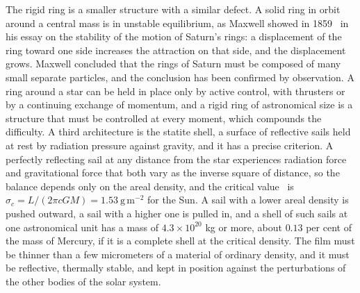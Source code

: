 The rigid ring is a smaller structure with a similar defect. A solid ring in orbit around a central mass is in unstable equilibrium, as Maxwell showed in 1859~\cite{maxwell1859} in his essay on the stability of the motion of Saturn's rings: a displacement of the ring toward one side increases the attraction on that side, and the displacement grows. Maxwell concluded that the rings of Saturn must be composed of many small separate particles, and the conclusion has been confirmed by observation. A ring around a star can be held in place only by active control, with thrusters or by a continuing exchange of momentum, and a rigid ring of astronomical size is a structure that must be controlled at every moment, which compounds the difficulty. A third architecture is the statite shell, a surface of reflective sails held at rest by radiation pressure against gravity, and it has a precise criterion. A perfectly reflecting sail at any distance from the star experiences radiation force and gravitational force that both vary as the inverse square of distance, so the balance depends only on the areal density, and the critical value~\cite{mcinnes1999} is $\sigma_c=L/(2\pi cGM)=1.53\ \mathrm{g\,m^{-2}}$ for the Sun. A sail with a lower areal density is pushed outward, a sail with a higher one is pulled in, and a shell of such sails at one astronomical unit has a mass of $4.3\times10^{20}$ kg or more, about $0.13$ per cent of the mass of Mercury, if it is a complete shell at the critical density. The film must be thinner than a few micrometers of a material of ordinary density, and it must be reflective, thermally stable, and kept in position against the perturbations of the other bodies of the solar system.


